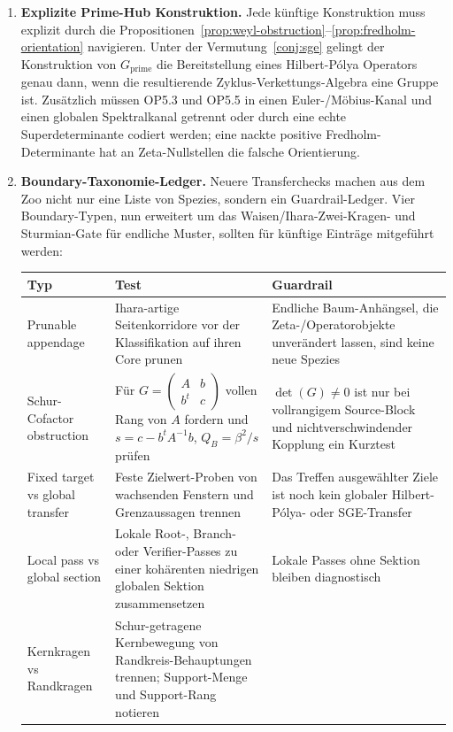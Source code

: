 \documentclass[11pt]{article}
\theoremstyle{definition}
\theoremstyle{remark}
\begin{document}
\begin{enumerate}
\item \textbf{Explizite Prime-Hub Konstruktion.} Jede künftige
  Konstruktion muss explizit durch die
  Propositionen~\ref{prop:weyl-obstruction}--\ref{prop:fredholm-orientation} navigieren.
  Unter der Vermutung~\ref{conj:sge} gelingt der Konstruktion von
  $G_\mathrm{prime}$ die Bereitstellung eines Hilbert-P\'olya Operators
  genau dann, wenn die resultierende Zyklus-Verkettungs-Algebra eine Gruppe ist.
  Zusätzlich müssen OP5.3 und OP5.5 in einen Euler-/Möbius-Kanal und
  einen globalen Spektralkanal getrennt oder durch eine echte
  Superdeterminante codiert werden; eine nackte positive
  Fredholm-Determinante hat an Zeta-Nullstellen die falsche Orientierung.

\item \textbf{Boundary-Taxonomie-Ledger.} Neuere Transferchecks machen
  aus dem Zoo nicht nur eine Liste von Spezies, sondern ein
  Guardrail-Ledger. Vier Boundary-Typen, nun erweitert um das
  Waisen/Ihara-Zwei-Kragen- und Sturmian-Gate für endliche Muster,
  sollten für künftige Einträge mitgeführt werden:
  \begin{center}
  \scriptsize
  \begin{tabular}{@{}p{}p{}p{}@{}}
  \toprule
  Typ & Test & Guardrail \\
  \midrule
  Prunable appendage &
  Ihara-artige Seitenkorridore vor der Klassifikation auf ihren Core prunen &
  Endliche Baum-Anhängsel, die Zeta-/Operatorobjekte unverändert lassen, sind keine neue Spezies \\
  Schur-Cofactor obstruction &
  Für $G=(\begin{smallmatrix}A&b\\ b^t&c\end{smallmatrix})$ vollen Rang von $A$ fordern und $s=c-b^tA^{-1}b$, $Q_B=\beta^2/s$ prüfen &
  $\det(G)\neq0$ ist nur bei vollrangigem Source-Block und nichtverschwindender Kopplung ein Kurztest \\
  Fixed target vs global transfer &
  Feste Zielwert-Proben von wachsenden Fenstern und Grenzaussagen trennen &
  Das Treffen ausgewählter Ziele ist noch kein globaler Hilbert-P\'olya- oder SGE-Transfer \\
  Local pass vs global section &
  Lokale Root-, Branch- oder Verifier-Passes zu einer kohärenten niedrigen globalen Sektion zusammensetzen &
  Lokale Passes ohne Sektion bleiben diagnostisch \\
  Kernkragen vs Randkragen &
  Schur-getragene Kernbewegung von Randkreis-Behauptungen trennen; Support-Menge und Support-Rang notieren &

\end{tabular}
\end{center}
\end{enumerate}
\end{document}
